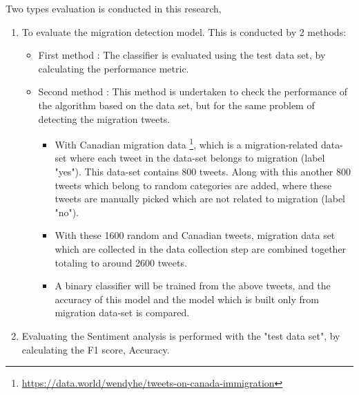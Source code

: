 Two types evaluation is conducted in this research,
\begin{enumerate}
    \item To evaluate the migration detection model. This is conducted by 2 methods:
    \begin{itemize}
        \item First method : 
        The classifier is evaluated using the test data set, by calculating the performance metric.
        \item Second method :
         This method is undertaken to check the performance of the algorithm based on the data set, but for the same problem of detecting the migration tweets.
        \begin{itemize}
       
            \item With Canadian migration data \footnote{\url{https://data.world/wendyhe/tweets-on-canada-immigration}}, which is a migration-related data-set where each tweet in the data-set belongs to migration (label "yes"). This data-set contains 800 tweets. Along
            with this another 800 tweets which belong to random categories are added, where these tweets are manually picked which are not related to migration (label "no"). 
            \item With these 1600 random and Canadian tweets, migration data set which are collected in the data collection step are combined together totaling to around 2600 tweets.
            \item A binary classifier will be trained from the above tweets, and the accuracy of this model and the model which is built only from migration data-set is compared.
        \end{itemize}
        
    \end{itemize}


    \item Evaluating the Sentiment analysis is performed with the "test data set",
by calculating the F1 score, Accuracy.
\end{enumerate}